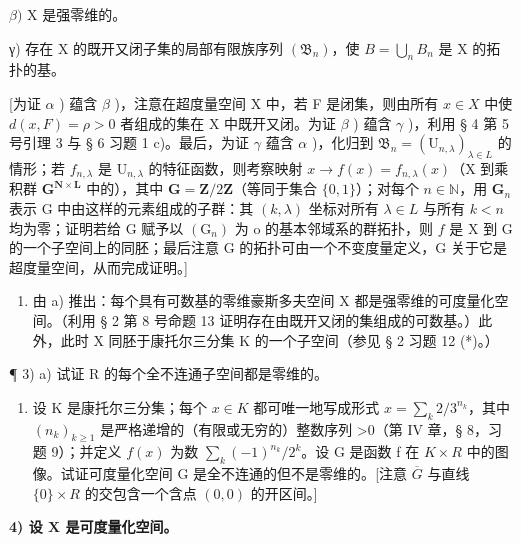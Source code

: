 \(\beta)\) X 是强零维的。

γ) 存在 X 的既开又闭子集的局部有限族序列 \((\mathfrak{B}_{n})\)，使 \(B = \bigcup_{n} B_{n}\) 是 X 的拓扑的基。

{[}为证 \(\alpha\) ) 蕴含 \(\beta\) )，注意在超度量空间 X 中，若 F 是闭集，则由所有 \(x \in X\) 中使 \(d(x, F) = \rho > 0\) 者组成的集在 X 中既开又闭。为证 \(\beta\) ) 蕴含 \(\gamma\) )，利用 § 4 第 5 号引理 3 与 § 6 习题 1 c)。最后，为证 \(\gamma\) 蕴含 \(\alpha\) )，化归到 \(\mathfrak{B}_n = (\mathrm{U}_{n,\lambda})_{\lambda \in L}\) 的情形；若 \(f_{n,\lambda}\) 是 \(\mathrm{U}_{n,\lambda}\) 的特征函数，则考察映射 \(x \to f(x) = f_{n,\lambda}(x)\)（X 到乘积群 \(\mathbf{G}^{\mathbf{N} \times \mathbf{L}}\) 中的），其中 \(\mathbf{G} = \mathbf{Z}/2\mathbf{Z}\)（等同于集合 \(\{0, 1\}\)）；对每个 \(n \in \mathbb{N}\)，用 \(\mathbf{G}_n\) 表示 G 中由这样的元素组成的子群：其 \((k, \lambda)\) 坐标对所有 \(\lambda \in L\) 与所有 \(k < n\) 均为零；证明若给 G 赋予以 \((\mathrm{G}_n)\) 为 o 的基本邻域系的群拓扑，则 \(f\) 是 X 到 G 的一个子空间上的同胚；最后注意 G 的拓扑可由一个不变度量定义，G 关于它是超度量空间，从而完成证明。{]}

\begin{enumerate}
\def\labelenumi{\alph{enumi})}
\setcounter{enumi}{1}
\tightlist
\item
  由 a) 推出：每个具有可数基的零维豪斯多夫空间 X 都是强零维的可度量化空间。（利用 § 2 第 8 号命题 13 证明存在由既开又闭的集组成的可数基。）此外，此时 X 同胚于康托尔三分集 K 的一个子空间（参见 § 2 习题 12 (*)。）
\end{enumerate}

¶ 3) a) 试证 R 的每个全不连通子空间都是零维的。

\begin{enumerate}
\def\labelenumi{\alph{enumi})}
\setcounter{enumi}{1}
\tightlist
\item
  设 K 是康托尔三分集；每个 \(x \in K\) 都可唯一地写成形式 \(x = \sum_{k} 2/3^{n_k}\)，其中 \((n_k)_{k \geqslant 1}\) 是严格递增的（有限或无穷的）整数序列 \textgreater0（第 IV 章，§ 8，习题 9）；并定义 \(f(x)\) 为数 \(\sum_{k} (-1)^{n_k}/2^k\)。设 G 是函数 f 在 \(K \times R\) 中的图像。试证可度量化空间 G 是全不连通的但不是零维的。{[}注意 \(\overline{G}\) 与直线 \(\{0\} \times R\) 的交包含一个含点 \((0, 0)\) 的开区间。{]}
\end{enumerate}

\par\noindent\textbf{4) 设 \(\mathbf{X}\) 是可度量化空间。}\par

